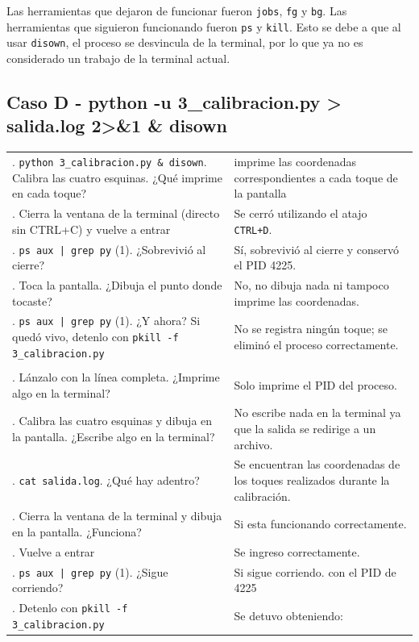 \documentclass[12pt, letterpaper]{article}
\begin{document}
Las herramientas que dejaron de funcionar fueron \texttt{jobs}, \texttt{fg} y \texttt{bg}. Las herramientas que siguieron funcionando fueron \texttt{ps} y \texttt{kill}. Esto se debe a que al usar \texttt{disown}, el proceso se desvincula de la terminal, por lo que ya no es considerado un trabajo de la terminal actual.


\subsection*{\fontsize{12}{17}\selectfont Caso D - python -u 3\_calibracion.py > salida.log 2>\&1 \& disown}

\renewcommand{\arraystretch}{1.35}
\begin{xltabular}{\textwidth}{|>{\raggedright\arraybackslash}X|>{\raggedright\arraybackslash}X|}
		\hline
		 \\ . \texttt{python 3\_calibracion.py \& disown}. Calibra las cuatro esquinas. ¿Qué imprime en cada toque? & imprime las coordenadas correspondientes a cada toque de la pantalla \\ . Cierra la ventana de la terminal (directo sin CTRL+C) y vuelve a entrar
		& Se cerró utilizando el atajo \texttt{CTRL+D}. \\ . \texttt{ps aux | grep py} (1). ¿Sobrevivió al cierre?
		& Sí, sobrevivió al cierre y conservó el PID 4225. \\ . Toca la pantalla. ¿Dibuja el punto donde tocaste?
		& No, no dibuja nada ni tampoco imprime las coordenadas. \\ . \texttt{ps aux | grep py} (1). ¿Y ahora? Si quedó vivo, detenlo con \texttt{pkill -f 3\_calibracion.py}
		& No se registra ningún toque; se eliminó el proceso correctamente. \\ \hline
		 \\ . Lánzalo con la línea completa. ¿Imprime algo en la terminal? & Solo imprime el PID del proceso. \\ . Calibra las cuatro esquinas y dibuja en la pantalla. ¿Escribe algo en la terminal? & No escribe nada en la terminal ya que la salida se redirige a un archivo. \\ . \texttt{cat salida.log}. ¿Qué hay adentro? & Se encuentran las coordenadas de los toques realizados durante la calibración. \\ . Cierra la ventana de la terminal y dibuja en la pantalla. ¿Funciona? & Si esta funcionando correctamente. \\ . Vuelve a entrar & Se ingreso correctamente. \\ . \texttt{ps aux | grep py} (1). ¿Sigue corriendo? & Si sigue corriendo.  con el PID de 4225\\ . Detenlo con \texttt{pkill -f 3\_calibracion.py} & Se detuvo obteniendo: \\ \hline
\end{xltabular}
\end{document}
